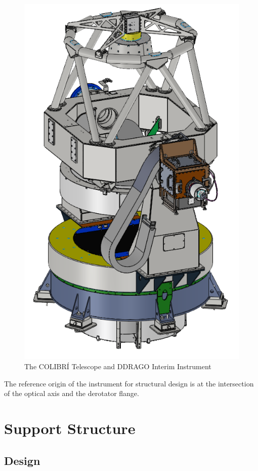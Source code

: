 \documentclass{article}
\begin{document}
\begin{figure}
\begin{center}
\includegraphics[width=0.8\linewidth]{newfigures/FigTelDDIN.png}
\end{center}
\caption{The COLIBRÍ Telescope and DDRAGO Interim Instrument}
\label{figure:alex-telescope-b}
\end{figure}

The reference origin of the instrument for structural design is at the intersection of the optical axis and the derotator flange.

\clearpage
\section{Support Structure}

\subsection{Design}
\end{document}
